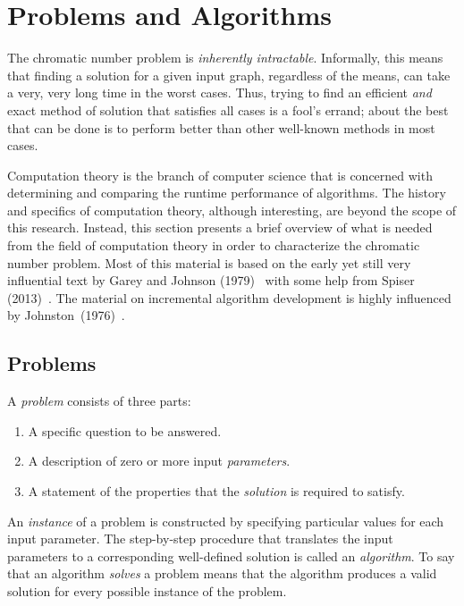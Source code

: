 \section{Problems and Algorithms}\label{sec:problems}

The chromatic number problem is \emph{inherently intractable}.  Informally, this means that finding a solution for
a given input graph, regardless of the means, can take a very, very long time in the worst cases.  Thus, trying to
find an efficient \emph{and} exact method of solution that satisfies all cases is a fool's errand; about the best
that can be done is to perform better than other well-known methods in most cases.

Computation theory is the branch of computer science that is concerned with determining and comparing the runtime
performance of algorithms.  The history and specifics of computation theory, although interesting, are beyond the
scope of this research.  Instead, this section presents a brief overview of what is needed from the field of
computation theory in order to characterize the chromatic number problem.  Most of this material is based on the
early yet still very influential text by Garey and Johnson (1979)~\cite{garey} with some help from Spiser
(2013)~\cite{sipser}.  The material on incremental algorithm development is highly influenced by
Johnston~(1976)~\cite{johnston}.

\subsection{Problems}\label{sec:sub:problems}

A \emph{problem} consists of three parts:

\begin{enumerate}
\item A specific question to be answered.
\item A description of zero or more input \emph{parameters}.
\item A statement of the properties that the \emph{solution} is required to satisfy.
\end{enumerate}

An \emph{instance} of a problem is constructed by specifying particular values for each input parameter.  The
step-by-step procedure that translates the input parameters to a corresponding well-defined solution is called an
\emph{algorithm}.  To say that an algorithm \emph{solves} a problem means that the algorithm produces a valid
solution for every possible instance of the problem.

